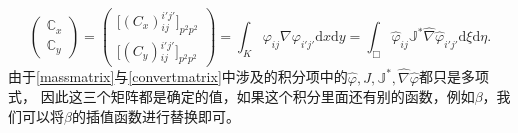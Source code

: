 \documentclass[10pt,reqno, final]{ctexartutf8}
\begin{document}
\begin{equation}\label{convertmatrix}
\left(
  \begin{array}{c}
  \mathbb{C}_x \\
  \mathbb{C}_y
  \end{array}
\right)
 =
 \left(
  \begin{array}{c}
  \big[(C_x){}_{ij}^{i'j'}\big]_{p^2p^2} \\
  \big[(C_y){}_{ij}^{i'j'}\big]_{p^2p^2}
  \end{array}
\right)
=\int_K
{\varphi}_{ij}
 \nabla   {\varphi}_{i'j'}  \text{d}x\text{d}y
=\int_\Box
\widehat{\varphi}_{ij}
\mathbb{J}^{*}\widehat\nabla    \widehat{\varphi}_{i'j'} \text{d}\xi\text{d}\eta.
\end{equation}
由于\eqref{massmatrix}与\eqref{convertmatrix}中涉及的积分项中的$\widehat\varphi,  J, \mathbb{J}^{*}, \widehat\nabla \widehat{\varphi}$都只是多项式，
因此这三个矩阵都是确定的值，如果这个积分里面还有别的函数，例如$\beta$，我们可以将$\beta$的插值函数进行替换即可。
\end{document}
